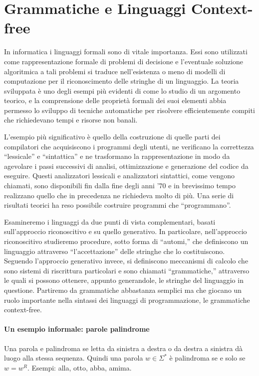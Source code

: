 \chapter{Grammatiche e Linguaggi Context-free}
In informatica i linguaggi formali sono di vitale importanza.
Essi sono utilizzati come rappresentazione formale di problemi di decisione e l’eventuale soluzione algoritmica a tali problemi si traduce nell’esistenza o meno di modelli di computazione per il riconoscimento delle stringhe di un linguaggio.
La teoria sviluppata è uno degli esempi più evidenti di come lo studio di un argomento teorico, e la comprensione delle proprietà formali dei suoi elementi abbia permesso lo sviluppo di tecniche automatiche per risolvere eﬃcientemente compiti che richiedevano tempi e risorse non banali.

L’esempio più signiﬁcativo è quello della costruzione di quelle parti dei compilatori che acquisiscono i programmi degli utenti, ne veriﬁcano la correttezza “lessicale” e “sintattica” e ne trasformano la rappresentazione in modo da agevolare i passi successivi di analisi, ottimizzazione e generazione del codice da eseguire.
Questi analizzatori lessicali e analizzatori sintattici, come vengono chiamati, sono disponibili ﬁn dalla ﬁne degli anni ’70 e in brevissimo tempo realizzano quello che in precedenza ne richiedeva molto di più.
Una serie di risultati teorici ha reso possibile costruire programmi che “programmano”.

Esamineremo i linguaggi da due punti di vista complementari, basati sull’approccio riconoscitivo e su quello generativo.
In particolare, nell’approccio riconoscitivo studieremo procedure, sotto forma di “automi,” che deﬁniscono un linguaggio attraverso “l’accettazione” delle stringhe che lo costituiscono.
Seguendo l’approccio generativo invece, si deﬁniscono meccanismi di calcolo che sono sistemi di riscrittura particolari e sono chiamati “grammatiche,” attraverso le quali si possono ottenere, appunto generandole, le stringhe del linguaggio in questione.
Partiremo da grammatiche abbastanza semplici ma che giocano un ruolo importante nella sintassi dei linguaggi di programmazione, le grammatiche context-free.

\subsubsection{Un esempio informale: parole palindrome}
Una parola e palindroma se letta da sinistra a destra o da destra a sinistra dà luogo alla stessa sequenza.
Quindi una parola $w \in \Sigma^{*}$ è palindroma se e solo se $w=w^{R}$.
Esempi: alla, otto, abba, amima.

